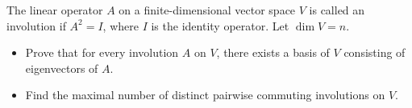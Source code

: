 The linear operator \(A\) on a finite-dimensional vector space \(V\) is called an involution if
\(A^{2}=I\), where \(I\) is the identity operator. Let \(\dim V=n\).
\begin{itemize}
    \item[(a)] Prove that for every involution \(A\) on \(V\), there exists a basis of \(V\) consisting of eigenvectors
    of \(A\).
    \item[(b)] Find the maximal number of distinct pairwise commuting involutions on \(V\).
\end{itemize}